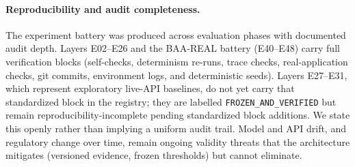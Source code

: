 \paragraph{Reproducibility and audit completeness.}
The experiment battery was produced across evaluation phases with documented audit depth. Layers E02--E26 and the BAA-REAL battery (E40--E48) carry full verification blocks (self-checks, determinism re-runs, trace checks, real-application checks, git commits, environment logs, and deterministic seeds). Layers E27--E31, which represent exploratory live-API baselines, do not yet carry that standardized block in the registry; they are labelled \texttt{FROZEN\_AND\_VERIFIED} but remain reproducibility-incomplete pending standardized block additions. We state this openly rather than implying a uniform audit trail. Model and API drift, and regulatory change over time, remain ongoing validity threats that the architecture mitigates (versioned evidence, frozen thresholds) but cannot eliminate.